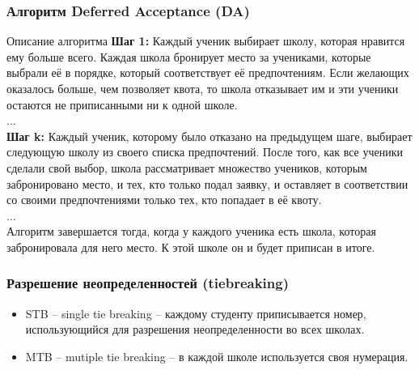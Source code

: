 \documentclass[10pt,pdf,hyperref={unicode}]{beamer}
\begin{document}
\begin{frame}
    \frametitle{Алгоритм Deferred Acceptance (DA)}
    \begin{block}{Описание алгоритма}
        {\bf Шаг 1:} Каждый ученик выбирает школу, которая нравится ему больше всего. Каждая школа бронирует место за учениками, которые выбрали её в порядке, который соответствует её предпочтениям. Если желающих оказалось больше, чем позволяет квота, то школа отказывает им и эти ученики остаются не приписанными ни к одной школе.\\
        $\dots$\\
        {\bf Шаг k:} Каждый ученик, которому было отказано на предыдущем шаге, выбирает следующую школу из своего списка предпочтений. После того, как все ученики сделали свой выбор, школа рассматривает множество учеников, которым забронировано место, и тех, кто только подал заявку, и оставляет в соответствии со своими предпочтениями только тех, кто попадает в её квоту.\\
        $\dots$\\
        Алгоритм завершается тогда, когда у каждого ученика есть школа, которая забронировала для него место. К этой школе он и будет приписан в итоге.
    \end{block}
\end{frame}

\begin{frame}
    \frametitle{Разрешение неопределенностей (tiebreaking)}
    \begin{block}{ }
        \begin{itemize}
        \item STB -- single tie breaking -- каждому студенту приписывается номер, использующийся для разрешения неопределенности во всех школах.
        \item MTB -- mutiple tie breaking -- в каждой школе используется своя нумерация.
        \end{itemize}
    \end{block}

    \begin{figure}[H]
        \noindent{}
    \end{figure}
\end{frame}
\end{document}
